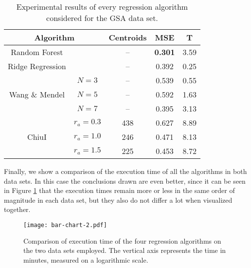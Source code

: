 \begin{table}[h!]
\centering
\caption{Experimental results of every regression algorithm considered for the GSA data set.}
\label{tab:gsa}
\begin{tabular}{ccccc}
\toprule
\multicolumn{2}{c}{Algorithm} & Centroids & MSE & T\\ \midrule
  Random Forest & & -- & \textbf{0.301} & 3.59 \\
  Ridge Regression & & -- & 0.392 &0.25\\
 \multirow{3}{*}{Wang \& Mendel} & $N=3$ & -- & 0.539 & 0.55\\
  & $N=5$ & -- & 0.592 & 1.63\\
  & $N=7$ & -- & 0.395 & 3.13\\
 \multirow{3}{*}{ChiuI} & $r_a=0.3$ & 438 & 0.627 & 8.89\\
  & $r_a=1.0$ &  246 & 0.471 & 8.13\\
  & $r_a=1.5$ &  225 & 0.453 & 8.72\\ \bottomrule
\end{tabular}
\end{table}

Finally, we show a comparison of the execution time of all the algorithms in both data sets. In this case the conclusions drawn are even better, since it can be seen in Figure \ref{fig:bar-chart-2} that the execution times remain more or less in the same order of magnitude in each data set, but they also do not differ a lot when visualized together.

\begin{figure}[h!]
\centering
\texttt{[image: bar-chart-2.pdf]}
\caption{Comparison of execution time of the four regression algorithms on the two data sets employed. The vertical axis represents the time in minutes, measured on a logarithmic scale.}
\label{fig:bar-chart-2}
\end{figure}
